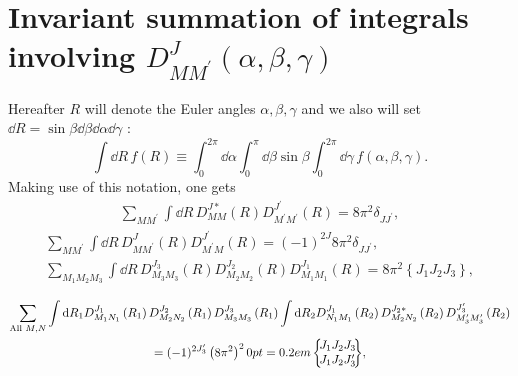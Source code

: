 \section{Invariant summation of integrals involving $D_{M M^{\prime}}^{J}(\alpha, \beta, \gamma)$}\label{sec:4.12}
Hereafter $R$ will denote the Euler angles $\alpha, \beta, \gamma$ and we also will set $\dd R=\sin \beta \dd \beta \dd \alpha \dd \gamma$ :
\begin{equation}
\int \dd R\, f(R) \equiv \int_{0}^{2 \pi} \dd \alpha \int_{0}^{\pi} \dd \beta \sin \beta \int_{0}^{2 \pi} \dd \gamma\, f(\alpha, \beta, \gamma) .\label{eq:4:12:1}
\end{equation}
Making use of this notation, one gets
\begin{gather}
\sum_{M M^{\prime}} \int \dd R\, D_{M M}^{J *}(R) D_{M^{\prime} M^{\prime}}^{J^{\prime}}(R)=8 \pi^{2} \delta_{J J^{\prime}} , \label{eq:4:12:2}
\end{gather}\begin{gather}
\sum_{M M^{\prime}} \int \dd R\, D_{M M^{\prime}}^{J}(R) D_{M^{\prime} M}^{J^{\prime}}(R)=(-1)^{2 J} 8 \pi^{2} \delta_{J J^{\prime}} , \label{eq:4:12:3}\\
\sum_{M_{1} M_{2} M_{3}} \int \dd R\, D_{M_{3} M_{3}}^{J_{3}}(R) D_{M_{2} M_{2}}^{J_{2}}(R) D_{M_{1} M_{1}}^{J_{1}}(R)=8 \pi^{2}\left\{J_{1} J_{2} J_{3}\right\} , \label{eq:4:12:4}
\end{gather}

\begin{multline}
\sum_{\text {All } M, N}
\int \dd R_{1} D_{M_{1} N_{1}}^{J_{1}}\left(R_{1}\right) D_{M_{2} N_{2}}^{J_{2}}\left(R_{1}\right) D_{M_{3} M_{3}}^{J_{3}}\left(R_{1}\right) 
\int \dd R_{2} D_{N_{1} M_{1}}^{J_{1}}\left(R_{2}\right) D_{M_{2} N_{2}}^{J_{2} *}\left(R_{2}\right) D_{M_{3}^{\prime} M_{3}^{\prime}}^{J_{3}^{\prime}}\left(R_{2}\right)  \\
=(-1)^{2 J_{3}^{\prime}}\left(8 \pi^{2}\right)^{2}
\sixj{J_1}{J_2}{J_3}{J_1}{J_2}{J_3^{\prime}}, \label{eq:4:12:5}
\end{multline}


